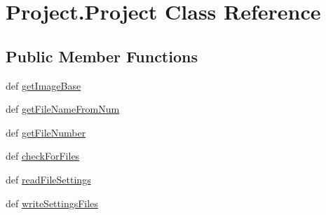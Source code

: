 \hypertarget{class_project_1_1_project}{\section{Project.\-Project Class Reference}
\label{class_project_1_1_project}
}
\subsection*{Public Member Functions}
\begin{DoxyCompactItemize}
\item 
def \hyperlink{class_project_1_1_project_af5d15337a24279fed5df943cdd17a521}{get\-Image\-Base}
\item 
def \hyperlink{class_project_1_1_project_af4f0a9adbac70beed61838e0552b5fce}{get\-File\-Name\-From\-Num}
\item 
def \hyperlink{class_project_1_1_project_a26e3cfe3e056c97f722eeef03137c475}{get\-File\-Number}
\item 
def \hyperlink{class_project_1_1_project_aa4241d0e834f8686b89e977ad6b16d26}{check\-For\-Files}
\item 
def \hyperlink{class_project_1_1_project_abcb28ed447f9094e8eb6d6a49b0c4294}{read\-File\-Settings}
\item 
def \hyperlink{class_project_1_1_project_a4b58bd09e8457006fb81aa85d7723a7d}{write\-Settings\-Files}
\end{DoxyCompactItemize}
